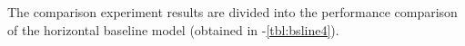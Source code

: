 





The comparison experiment results are divided into the performance comparison of the horizontal baseline model (obtained in \tblname{\ref{tbl:bsline1}}-\ref{tbl:bsline4}).

